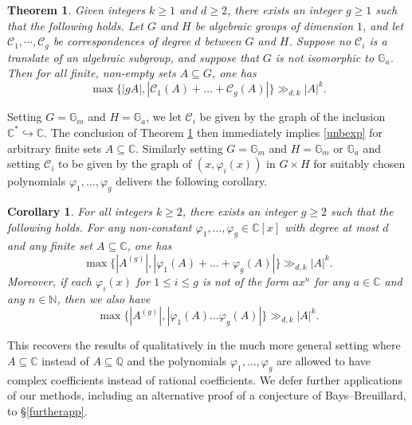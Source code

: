 \documentclass[12pt, reqno]{amsart}
\newtheorem{corollary}[theorem]{Corollary}
\newtheorem{thm}[theorem]{Theorem}
\theoremstyle{remark}
\theoremstyle{definition}
\numberwithin{equation}{section}
\begin{document}
\begin{thm}\label{thmdelta}  Given integers $k \geq 1$ and $d \geq 2$, there exists an integer $g \geq 1$ such that the following holds. Let $G$ and $H$ be algebraic groups of dimension $1$, and let $\mathcal{C}_1, \cdots, \mathcal{C}_g$ be correspondences  of degree $d$ between $G$ and $H$. Suppose no $\mathcal{C}_i$ is a translate of an algebraic subgroup, and suppose that $G$ is not isomorphic to $\mathbb{G}_a$.  Then for all finite, non-empty sets $A \subseteq G$, one has
$$\max\{|gA|, |\mathcal{C}_1(A) + \dots + \mathcal{C}_g(A)|\} \gg_{d,k}|A|^{ k}. $$
\end{thm}


Setting $G = \mathbb{G}_m$ and $H = \mathbb{G}_a$, we let $\mathcal{C}_i$ be given by the graph of the inclusion $\mathbb{C}^\ast \hookrightarrow \mathbb{C}$. The conclusion of Theorem \ref{thmdelta} then immediately implies \eqref{unbexp} for arbitrary finite sets $A \subseteq \mathbb{C}$. Similarly setting $G = \mathbb{G}_m$ and $H = \mathbb{G}_m$ or $\mathbb{G}_a$ and setting $\mathcal{C}_i$ to be given by the graph of $(x, \varphi_i(x))$ in $G \times H$ for suitably chosen polynomials $\varphi_1, \dots, \varphi_g$ delivers the following corollary. 
\begin{corollary} \label{shiftedbc}
    For all integers $k \geq 2$, there exists an integer $g \geq 2$ such that the following holds. For any non-constant $\varphi_1, \dots, \varphi_g \in \mathbb{C}[x]$ with degree at most $d$ and any finite set $A \subseteq \mathbb{C}$, one has
    \[ \max\{ |A^{(g)}| , |\varphi_1(A) + \dots + \varphi_g(A)| \} \gg_{d,k} |A|^k. \]
    Moreover, if each $\varphi_i(x)$ for $1 \leq i \leq g$ is not of the form $a x^n$ for any $a \in \mathbb{C}$ and any $n \in \mathbb{N}$, then we also have
    \[  \max\{ |A^{(g)}| , |\varphi_1(A) \dots  \varphi_g(A)| \} \gg_{d,k} |A|^k. \]
\end{corollary}

This recovers the results of \cite{HRNZ2020, Mu2024b} qualitatively in the much more general setting where $A \subseteq \mathbb{C}$ instead of $A \subseteq \mathbb{Q}$ and the polynomials $\varphi_1, \dots, \varphi_g$ are allowed to have complex coefficients instead of rational coefficients. We defer further applications of our methods, including an alternative proof of a conjecture of Bays--Breuillard, to \S \ref{furtherapp}. 
\end{document}
